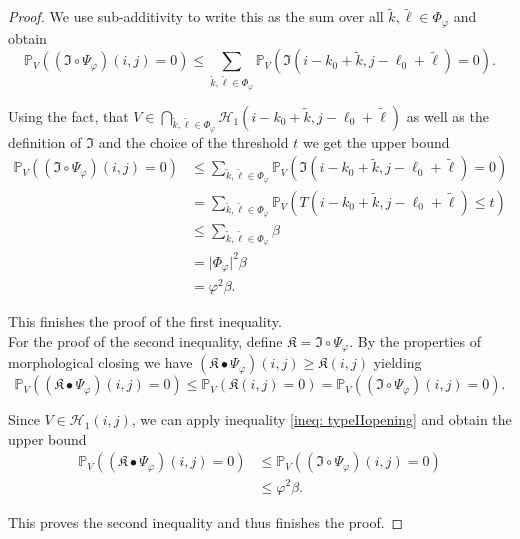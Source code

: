 \documentclass[a4paper,12pt]{article}
\newcommand{\abs}[1]{\lvert#1\rvert}
\theoremstyle{plain}
\theoremstyle{definition}
\begin{document}
\begin{proof}
	We use sub-additivity to write this as the sum over all $\tilde{k}, \tilde{\ell} \in \Phi_\varphi$ and obtain
	\begin{equation*}
		\mathbb{P}_V\left( (\mathfrak{I} \circ \Psi_\varphi)(i, j) = 0 \right) \leq \sum_{\tilde{k}, \tilde{\ell} \in \Phi_\varphi} \mathbb{P}_V\left( \mathfrak{I}(i - k_0 + \tilde{k}, j - \ell_0 + \tilde{\ell}) = 0 \right).
	\end{equation*}
	
	Using the fact, that $V \in \bigcap_{\tilde{k}, \tilde{\ell} \in \Phi_\varphi} \mathcal{H}_1(i - k_0 + \tilde{k}, j - \ell_0 + \tilde{\ell})$ as well as the definition of $\mathfrak{I}$ and the choice of the threshold $t$ we get the upper bound
	\begin{align*}
		\mathbb{P}_V\left( (\mathfrak{I} \circ \Psi_\varphi)(i, j) = 0 \right) &\leq \sum_{\tilde{k}, \tilde{\ell} \in \Phi_\varphi} \mathbb{P}_V\left( \mathfrak{I}(i - k_0 + \tilde{k}, j - \ell_0 + \tilde{\ell}) = 0 \right) \\
		&= \sum_{\tilde{k}, \tilde{\ell} \in \Phi_\varphi} \mathbb{P}_V\left( T(i - k_0 + \tilde{k}, j - \ell_0 + \tilde{\ell}) \leq t \right) \\
		&\leq \sum_{\tilde{k}, \tilde{\ell} \in \Phi_\varphi} \beta \\
		&= \abs{\Phi_\varphi}^2 \beta \\
		&= \varphi^2 \beta.
	\end{align*}
	
	This finishes the proof of the first inequality.\\
	
	
	For the proof of the second inequality, define $\mathfrak{K} = \mathfrak{I} \circ \Psi_\varphi$. By the properties of morphological closing we have $(\mathfrak{K} \bullet \Psi_\varphi)(i, j) \geq \mathfrak{K}(i, j)$ yielding
	\begin{equation*}
		\mathbb{P}_V\left( (\mathfrak{K} \bullet \Psi_\varphi)(i, j) = 0 \right) \leq \mathbb{P}_V\left( \mathfrak{K}(i, j) = 0 \right) = \mathbb{P}_V\left( (\mathfrak{I} \circ \Psi_\varphi)(i, j) = 0 \right).
	\end{equation*}
	
	Since $V \in \mathcal{H}_1(i, j)$, we can apply inequality \eqref{ineq: typeIIopening} and obtain the upper bound
	\begin{align*}
		\mathbb{P}_V\left( (\mathfrak{K} \bullet \Psi_\varphi)(i, j) = 0 \right) &\leq \mathbb{P}_V\left( (\mathfrak{I} \circ \Psi_\varphi)(i, j) = 0 \right) \\
		&\leq \varphi^2 \beta.
	\end{align*}
	
	This proves the second inequality and thus finishes the proof.
\end{proof}
\end{document}
